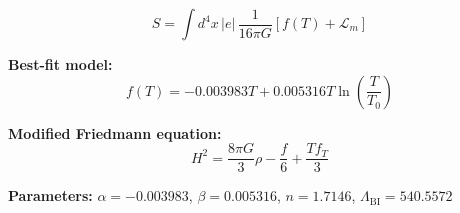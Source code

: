 
\begin{equation}
  S = \int d^4x \, |e| \, \frac{1}{16\pi G} \left[ f(T) + \mathcal{L}_m \right]
\end{equation}

\textbf{Best-fit model:}
\begin{equation}
  f(T) = -0.003983 T + 0.005316 T \ln\!\left(\frac{T}{T_0}\right)
\end{equation}

\textbf{Modified Friedmann equation:}
\begin{equation}
  H^2 = \frac{8\pi G}{3} \rho - \frac{f}{6} + \frac{T f_T}{3}
\end{equation}

\textbf{Parameters:}
$\alpha = -0.003983$, \quad
$\beta = 0.005316$, \quad
$n = 1.7146$, \quad
$\Lambda_{\text{BI}} = 540.5572$
